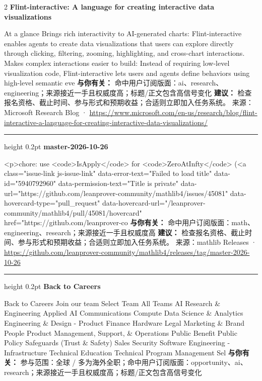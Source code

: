 \documentclass[10.5pt]{ctexart}
\begin{document}
\begin{multicols}{2}
{\large\bfseries Flint-interactive: A language for creating interactive data visualizations}\par
At a glance Brings rich interactivity to AI-generated charts: Flint-interactive enables agents to create data visualizations that users can explore directly through clicking, filtering, zooming, highlighting, and cross-chart interactions. Makes complex interactions easier to build: Instead of requiring low-level visualization code, Flint-interactive lets users and agents define behaviors using high-level semantic eve
\textbf{与你有关：} 命中用户订阅版面：ai、research、engineering；来源接近一手且权威度高；标题/正文包含高信号变化
\textbf{建议：} 检查报名资格、截止时间、参与形式和预期收益；合适则立即加入任务系统。
{\footnotesize\color{ormuted} 来源：Microsoft Research Blog · \url{https://www.microsoft.com/en-us/research/blog/flint-interactive-a-language-for-creating-interactive-data-visualizations/}}
\vspace{2mm}
\hrule height 0.2pt
\vspace{2mm}
{\large\bfseries master-2026-10-26}\par
<p>chore: use <code>IsApply</code> for <code>ZeroAtInfty</code> (<a class="issue-link js-issue-link" data-error-text="Failed to load title" data-id="5940792960" data-permission-text="Title is private" data-url="https://github.com/leanprover-community/mathlib4/issues/45081" data-hovercard-type="pull\_request" data-hovercard-url="/leanprover-community/mathlib4/pull/45081/hovercard" href="https://github.com/leanprover-co
\textbf{与你有关：} 命中用户订阅版面：math、engineering、research；来源接近一手且权威度高
\textbf{建议：} 检查报名资格、截止时间、参与形式和预期收益；合适则立即加入任务系统。
{\footnotesize\color{ormuted} 来源：mathlib Releases · \url{https://github.com/leanprover-community/mathlib4/releases/tag/master-2026-10-26}}
\vspace{2mm}
\hrule height 0.2pt
\vspace{2mm}
{\large\bfseries Back to Careers}\par
Back to Careers Join our team Select Team All Teams AI Research \& Engineering Applied AI Communications Compute Data Science \& Analytics Engineering \& Design - Product Finance Hardware Legal Marketing \& Brand People Product Management, Support, \& Operations Public Benefit Public Policy Safeguards (Trust \& Safety) Sales Security Software Engineering - Infrastructure Technical Education Technical Program Management Sel
\textbf{与你有关：} 参与范围：全球 / 多为海外全职；命中用户订阅版面：opportunity、ai、research；来源接近一手且权威度高；标题/正文包含高信号变化

\end{multicols}
\end{document}

